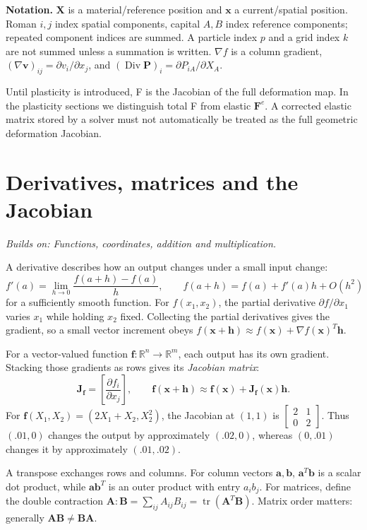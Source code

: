 \documentclass[11pt,a4paper]{article}
\newcommand{\mat}[1]{\mathbf{#1}}
\newcommand{\prereq}[1]{\textit{Builds on: #1}\par}
\DeclareMathOperator{\tr}{tr}
\DeclareMathOperator{\Div}{Div}
\numberwithin{equation}{section}
\begin{document}
\textbf{Notation.} $\mat{X}$ is a material/reference position and $\mat{x}$ a
current/spatial position. Roman $i,j$ index spatial components, capital $A,B$
index reference components; repeated component indices are summed. A particle
index $p$ and a grid index $k$ are not summed unless a summation is written.
$\nabla f$ is a column gradient, $(\nabla\mat{v})_{ij}=\partial v_i/\partial x_j$,
and $(\Div\mat{P})_i=\partial P_{iA}/\partial X_A$.

Until plasticity is introduced, F is the Jacobian of the full deformation map.
In the plasticity sections we distinguish total F from elastic $\mat{F}^e$.
A corrected elastic matrix stored by a solver must not automatically be treated
as the full geometric deformation Jacobian.

\section{Derivatives, matrices and the Jacobian}\label{sec:jacobian}
\prereq{Functions, coordinates, addition and multiplication.}
A derivative describes how an output changes under a small input change:
\[
f'(a)=\lim_{h\to0}\frac{f(a+h)-f(a)}h,
\qquad f(a+h)=f(a)+f'(a)h+O(h^2)
\]
for a sufficiently smooth function. For $f(x_1,x_2)$, the partial derivative
$\partial f/\partial x_1$ varies $x_1$ while holding $x_2$ fixed. Collecting the
partial derivatives gives the gradient, so a small vector increment obeys
$f(\mat{x}+\mat{h})\approx f(\mat{x})+\nabla f(\mat{x})^T\mat{h}$.

For a vector-valued function $\mat{f}:\mathbb R^n\to\mathbb R^m$, each output
has its own gradient. Stacking those gradients as rows gives its
\emph{Jacobian matrix}:
\begin{equation}\label{eq:jacobian}
\mat{J}_{\mat f}=\left[\frac{\partial f_i}{\partial x_j}\right],
\qquad
\mat f(\mat x+\mat h)\approx\mat f(\mat x)+\mat J_{\mat f}(\mat x)\mat h.
\end{equation}
For $\mat f(X_1,X_2)=(2X_1+X_2,X_2^2)$, the Jacobian at $(1,1)$ is
$\left[\begin{smallmatrix}2&1\\0&2\end{smallmatrix}\right]$.
Thus $(.01,0)$ changes the output by approximately $(.02,0)$, whereas
$(0,.01)$ changes it by approximately $(.01,.02)$.

A transpose exchanges rows and columns. For column vectors $\mat a,\mat b$,
$\mat a^T\mat b$ is a scalar dot product, while $\mat a\mat b^T$ is an outer
product with entry $a_i b_j$. For matrices, define the double contraction
$\mat A:\mat B=\sum_{ij}A_{ij}B_{ij}=\tr(\mat A^T\mat B)$.
Matrix order matters: generally $\mat A\mat B\ne\mat B\mat A$.
\end{document}

